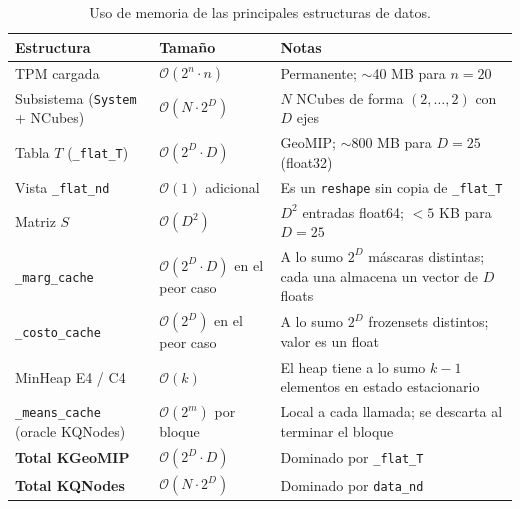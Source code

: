 \begin{table}[H]
  \centering
  \caption{Uso de memoria de las principales estructuras de datos.}
  \label{tab:complejidad_espacial}
  \begin{tabular}{p{3.5cm} p{3cm} p{6.5cm}}
    \toprule
    \textbf{Estructura} & \textbf{Tamaño} & \textbf{Notas} \\
    \midrule
    TPM cargada
      & $\mathcal{O}(2^n \cdot n)$
      & Permanente; $\sim$40 MB para $n=20$ \\[3pt]

    Subsistema (\texttt{System} + NCubes)
      & $\mathcal{O}(N \cdot 2^D)$
      & $N$ NCubes de forma $(2,\ldots,2)$ con $D$ ejes \\[3pt]

    Tabla $T$ (\texttt{\_flat\_T})
      & $\mathcal{O}(2^D \cdot D)$
      & GeoMIP; $\sim$800 MB para $D=25$ (float32) \\[3pt]

    Vista \texttt{\_flat\_nd}
      & $\mathcal{O}(1)$ adicional
      & Es un \texttt{reshape} sin copia de \texttt{\_flat\_T} \\[3pt]

    Matriz $S$
      & $\mathcal{O}(D^2)$
      & $D^2$ entradas float64; $< 5$ KB para $D=25$ \\[3pt]

    \texttt{\_marg\_cache}
      & $\mathcal{O}(2^D \cdot D)$ en el peor caso
      & A lo sumo $2^D$ máscaras distintas; cada una almacena
        un vector de $D$ floats \\[3pt]

    \texttt{\_costo\_cache}
      & $\mathcal{O}(2^D)$ en el peor caso
      & A lo sumo $2^D$ frozensets distintos; valor es un float \\[3pt]

    MinHeap E4 / C4
      & $\mathcal{O}(k)$
      & El heap tiene a lo sumo $k{-}1$ elementos en estado estacionario \\[3pt]

    \texttt{\_means\_cache} (oracle KQNodes)
      & $\mathcal{O}(2^m)$ por bloque
      & Local a cada llamada; se descarta al terminar el bloque \\[3pt]

    \midrule
    \textbf{Total KGeoMIP}
      & $\mathcal{O}(2^D \cdot D)$
      & Dominado por \texttt{\_flat\_T} \\[3pt]

    \textbf{Total KQNodes}
      & $\mathcal{O}(N \cdot 2^D)$
      & Dominado por \texttt{data\_nd} \\
    \bottomrule
  \end{tabular}
\end{table}

